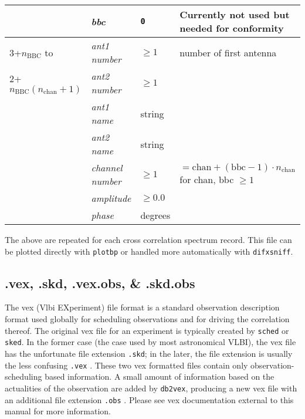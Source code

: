 \begin{center}
\begin{tabular}{l l l l}
  & {\it bbc}                 & {\tt 0}            & Currently not used but needed for conformity \\
\hline
3+$n_{\mathrm{BBC}}$ to 
  & {\it ant1 number}    & $\ge 1$            & number of first antenna \\
2+$n_{\mathrm{BBC}}(n_{\mathrm{chan}}+1)$  
  & {\it ant2 number}    & $\ge 1$            & \\
  & {\it ant1 name}      & string             & \\
  & {\it ant2 name}      & string             & \\
  & {\it channel number}      & $\ge 1$            & $= \mathrm{chan} + (\mathrm{bbc}-1) \cdot n_{\mathrm{chan}}$ for chan, bbc $\ge 1$ \\
  & {\it amplitude}           & $\ge 0.0$          & \\
  & {\it phase}               & degrees            & \\
\hline
\end{tabular}
\end{center}

\noindent
The above are repeated for each cross correlation spectrum record.
This file can be plotted directly with {\tt plotbp} or handled more automatically with {\tt difxsniff}.









\subsection{.vex, .skd, .vex.obs, \& .skd.obs} \label{sec:dotvex}

The vex (Vlbi EXperiment) file \cite{vex} format is a standard observation description format used globally for scheduling observations and for driving the correlation thereof.
The original vex file for an experiment is typically created by {\tt sched} or {\tt sked}. 
In the former case (the case used by most astronomical VLBI), the vex file has the unfortunate file extension {\tt .skd}; in the later, the file extension is usually the less confusing {\tt .vex} .
These two vex formatted files contain only observation-scheduling based information.
A small amount of information based on the actualities of the observation are added by {\tt db2vex}, producing a new vex file with an additional file extension {\tt .obs} .
Please see vex documentation external to this manual for more information.



